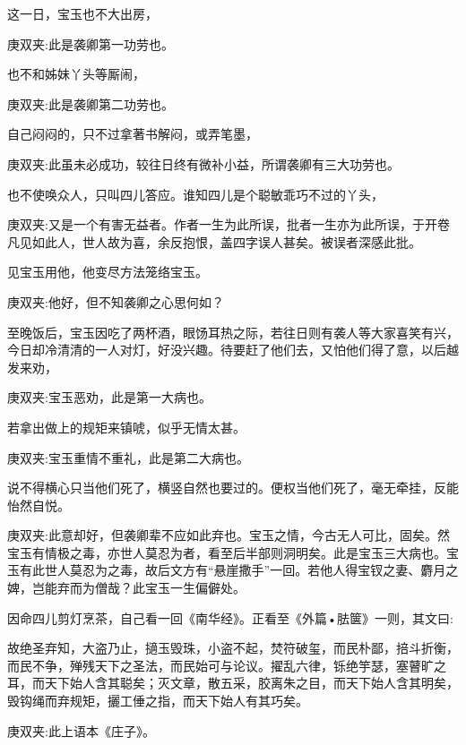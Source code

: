 \begin{parag}
    这一日，宝玉也不大出房，\begin{note}庚双夹:此是袭卿第一功劳也。\end{note}也不和姊妹丫头等厮闹，\begin{note}庚双夹:此是袭卿第二功劳也。\end{note}自己闷闷的，只不过拿著书解闷，或弄笔墨，\begin{note}庚双夹:此虽未必成功，较往日终有微补小益，所谓袭卿有三大功劳也。\end{note}也不使唤众人，只叫四儿答应。谁知四儿是个聪敏乖巧不过的丫头，\begin{note}庚双夹:又是一个有害无益者。作者一生为此所误，批者一生亦为此所误，于开卷凡见如此人，世人故为喜，余反抱恨，盖四字误人甚矣。被误者深感此批。\end{note}见宝玉用他，他变尽方法笼络宝玉。\begin{note}庚双夹:他好，但不知袭卿之心思何如？\end{note}至晚饭后，宝玉因吃了两杯酒，眼饧耳热之际，若往日则有袭人等大家喜笑有兴，今日却冷清清的一人对灯，好没兴趣。待要赶了他们去，又怕他们得了意，以后越发来劝，\begin{note}庚双夹:宝玉恶劝，此是第一大病也。\end{note}若拿出做上的规矩来镇唬，似乎无情太甚。\begin{note}庚双夹:宝玉重情不重礼，此是第二大病也。\end{note}说不得横心只当他们死了，横竖自然也要过的。便权当他们死了，毫无牵挂，反能怡然自悦。\begin{note}庚双夹:此意却好，但袭卿辈不应如此弃也。宝玉之情，今古无人可比，固矣。然宝玉有情极之毒，亦世人莫忍为者，看至后半部则洞明矣。此是宝玉三大病也。宝玉有此世人莫忍为之毒，故后文方有“悬崖撒手”一回。若他人得宝钗之妻、麝月之婢，岂能弃而为僧哉？此宝玉一生偏僻处。\end{note}因命四儿剪灯烹茶，自己看一回《南华经》。正看至《外篇•胠箧》一则，其文曰:
\end{parag}


\begin{qute2sp}

    故绝圣弃知，大盗乃止，擿玉毁珠，小盗不起，焚符破玺，而民朴鄙，掊斗折衡，而民不争，殚残天下之圣法，而民始可与论议。擢乱六律，铄绝竽瑟，塞瞽旷之耳，而天下始人含其聪矣；灭文章，散五采，胶离朱之目，而天下始人含其明矣，毁钩绳而弃规矩，攦工倕之指，而天下始人有其巧矣。\begin{note}庚双夹:此上语本《庄子》。\end{note}
\end{qute2sp}


